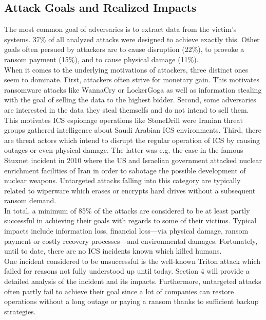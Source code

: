 \documentclass[runningheads]{llncs}
\begin{document}
\subsection{Attack Goals and Realized Impacts}
The most common goal of adversaries is to extract data from the victim's systems. 37\% of all analyzed attacks were designed to achieve exactly this.
Other goals often persued by attackers are to cause disruption (22\%), to provoke a ransom payment (15\%), and to cause physical damage (11\%).\\
When it comes to the underlying motivations of attackers, three distinct ones seem to dominate.
First, attackers often strive for monetary gain.
This motivates ransomware attacks like WannaCry or LockerGoga as well as information stealing with the goal of selling the data to the highest bidder.
Second, some adversaries are interested in the data they steal themselfs and do not intend to sell them.
This motivates ICS espionage operations like StoneDrill were Iranian threat groups gathered intelligence about Saudi Arabian ICS environments.
Third, there are threat actors which intend to disrupt the regular operation of ICS by causing outages or even physical damage.
The latter was e.g. the case in the famous Stuxnet incident in 2010 where the US and Israelian government attacked nuclear enrichment facilities of Iran in order to sabotage the possible development of nuclear weapons.
Untargeted attacks falling into this category are typically related to wiperware which erases or encrypts hard drives without a subsequent ransom demand.\\
In total, a minimum of 85\% of the attacks are considered to be at least partly successful in achieving their goals with regards to some of their victims.
Typical impacts include information loss, financial loss---via physical damage, ransom payment or costly recovery processes---and environmental damages.
Fortunately, until to date, there are no ICS incidents known which killed humans.\\
One incident considered to be unsuccessful is the well-known Triton attack which failed for reasons not fully understood up until today.
Section 4 will provide a detailed analysis of the incident and its impacts.
Furthermore, untargeted attacks often partly fail to achieve their goal since a lot of companies can restore operations without a long outage or paying a ransom thanks to sufficient backup strategies.
\end{document}
